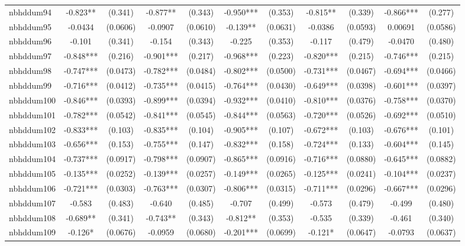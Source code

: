 \documentclass[]{article}
\begin{document}
\begin{tabular}{lcccccccccc}
nbhddum94 & -0.823** & (0.341) & -0.877** & (0.343) & -0.950*** & (0.353) & -0.815** & (0.339) & -0.866*** & (0.277) \\
nbhddum95 & -0.0434 & (0.0606) & -0.0907 & (0.0610) & -0.139** & (0.0631) & -0.0386 & (0.0593) & 0.00691 & (0.0586) \\
nbhddum96 & -0.101 & (0.341) & -0.154 & (0.343) & -0.225 & (0.353) & -0.117 & (0.479) & -0.0470 & (0.480) \\
nbhddum97 & -0.848*** & (0.216) & -0.901*** & (0.217) & -0.968*** & (0.223) & -0.820*** & (0.215) & -0.746*** & (0.215) \\
nbhddum98 & -0.747*** & (0.0473) & -0.782*** & (0.0484) & -0.802*** & (0.0500) & -0.731*** & (0.0467) & -0.694*** & (0.0466) \\
nbhddum99 & -0.716*** & (0.0412) & -0.735*** & (0.0415) & -0.764*** & (0.0430) & -0.649*** & (0.0398) & -0.601*** & (0.0397) \\
nbhddum100 & -0.846*** & (0.0393) & -0.899*** & (0.0394) & -0.932*** & (0.0410) & -0.810*** & (0.0376) & -0.758*** & (0.0370) \\
nbhddum101 & -0.782*** & (0.0542) & -0.841*** & (0.0545) & -0.844*** & (0.0563) & -0.720*** & (0.0526) & -0.692*** & (0.0510) \\
nbhddum102 & -0.833*** & (0.103) & -0.835*** & (0.104) & -0.905*** & (0.107) & -0.672*** & (0.103) & -0.676*** & (0.101) \\
nbhddum103 & -0.656*** & (0.153) & -0.755*** & (0.147) & -0.832*** & (0.158) & -0.724*** & (0.133) & -0.604*** & (0.145) \\
nbhddum104 & -0.737*** & (0.0917) & -0.798*** & (0.0907) & -0.865*** & (0.0916) & -0.716*** & (0.0880) & -0.645*** & (0.0882) \\
nbhddum105 & -0.135*** & (0.0252) & -0.139*** & (0.0257) & -0.149*** & (0.0265) & -0.125*** & (0.0241) & -0.104*** & (0.0237) \\
nbhddum106 & -0.721*** & (0.0303) & -0.763*** & (0.0307) & -0.806*** & (0.0315) & -0.711*** & (0.0296) & -0.667*** & (0.0296) \\
nbhddum107 & -0.583 & (0.483) & -0.640 & (0.485) & -0.707 & (0.499) & -0.573 & (0.479) & -0.499 & (0.480) \\
nbhddum108 & -0.689** & (0.341) & -0.743** & (0.343) & -0.812** & (0.353) & -0.535 & (0.339) & -0.461 & (0.340) \\
nbhddum109 & -0.126* & (0.0676) & -0.0959 & (0.0680) & -0.201*** & (0.0699) & -0.121* & (0.0647) & -0.0793 & (0.0637) \\

\end{tabular}
\end{document}
